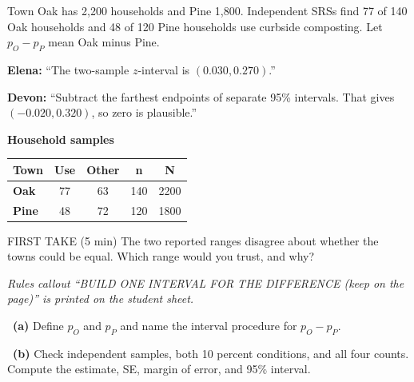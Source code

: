 \documentclass[11pt]{article}
\begin{document}
Town Oak has 2{,}200 households and Pine 1{,}800. Independent SRSs find 77 of 140 Oak households and 48 of 120 Pine households use curbside composting. Let $p_O-p_P$ mean Oak minus Pine.\par\smallskip \textbf{Elena:} ``The two-sample $z$-interval is $(0.030,0.270)$.''\par \textbf{Devon:} ``Subtract the farthest endpoints of separate 95\% intervals. That gives $(-0.020,0.320)$, so zero is plausible.''\par
\begin{center}
\textbf{Household samples}\par\smallskip
\begin{tabular}{|l|c|c|c|c|}
\hline
\textbf{Town} & \textbf{Use} & \textbf{Other} & \textbf{n} & \textbf{N} \\ \hline
\textbf{Oak} & 77 & 63 & 140 & 2200 \\ \hline
\textbf{Pine} & 48 & 72 & 120 & 1800 \\ \hline
\end{tabular}
\end{center}
\begin{firsttakebox}{FIRST TAKE (5 min)}
The two reported ranges disagree about whether the towns could be equal. Which range would you trust, and why?\par
{}
\end{firsttakebox}

\textit{Rules callout ``BUILD ONE INTERVAL FOR THE DIFFERENCE (keep on the page)'' is printed on the student sheet.}\par\medskip

~\textbf{(a)} Define $p_O$ and $p_P$ and name the interval procedure for $p_O-p_P$.\par
{}

~\textbf{(b)} Check independent samples, both 10 percent conditions, and all four counts. Compute the estimate, SE, margin of error, and 95\% interval.\par
{}
\end{document}
